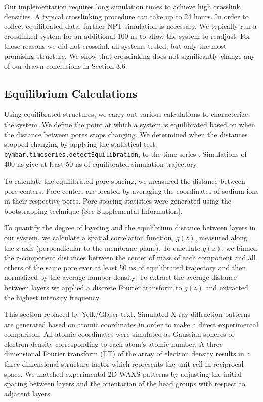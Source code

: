 \documentclass{article}
\begin{document}
  Our implementation requires long simulation times to achieve high crosslink 
  densities. A typical crosslinking procedure can take up to 24 hours. In
  order to collect equilibrated data, further NPT simulation is necessary. We
  typically run a crosslinked system for an additional 100 ns to allow the system
  to readjust. For those reasons we did not crosslink all systems tested, but only
  the most promising structure. We show that crosslinking does not significantly
  change any of our drawn conclusions in Section 3.6.

  \subsection{Equilibrium Calculations}

  Using equilibrated structures, we carry out various calculations to
  characterize the system. We define the point at which a system is equilibrated
  based on when the distance between pores stops changing.  We determined when
  the distances stopped changing by applying the statistical test,
  \texttt{pymbar.timeseries.detectEquilibration}, to the time series
  \cite{chodera_simple_2016,shirts_statistically_2008}.  Simulations of 400 ns
  give at least 50 ns of equilibrated simulation trajectory.

  To calculate the equilibrated pore spacing, we measured the distance between
  pore centers. Pore centers are located by averaging the coordinates of sodium
  ions in their respective pores. Pore spacing statistics were generated 
  using the bootstrapping technique (See Supplemental Information).

  To quantify the degree of layering and the equilibrium distance between layers
  in our system, we calculate a spatial correlation function, $g(z)$, measured
  along the z-axis (perpendicular to the membrane plane). To calculate $g(z)$,
  we binned the z-component distances between the center of mass of each
  component and all others of the same pore over at least 50 ns of equilibrated
  trajectory and then normalized by the average number density. To extract the
  average distance between layers we applied a discrete Fourier transform to
  $g(z)$ and extracted the highest intensity frequency.

  {\color{red}This section replaced by Yelk/Glaser text}. 
  Simulated X-ray diffraction patterns are generated based on atomic
  coordinates in order to make a direct experimental comparison. All atomic
  coordinates were simulated as Gaussian spheres of electron density
  corresponding to each atom's atomic number. A three dimensional Fourier
  transform (FT) of the array of electron density results in a three dimensional
  structure factor which represents the unit cell in reciprocal space. We matched
  experimental 2D WAXS patterns by adjusting the initial spacing between layers
  and the orientation of the head groups with respect to adjacent layers.
\end{document}
